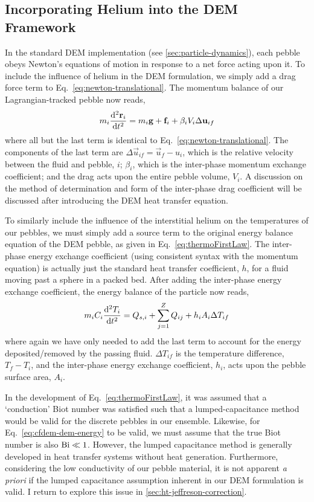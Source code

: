 \subsection{Incorporating Helium into the DEM Framework}\label{sec:cfdem-heat-transfer}

In the standard DEM implementation (see \cref{sec:particle-dynamics}), each pebble obeys Newton's equations of motion in response to a net force acting upon it. To include the influence of helium in the DEM formulation, we simply add a drag force term to Eq.~\ref{eq:newton-translational}. The momentum balance of our Lagrangian-tracked pebble now reads,
\begin{equation}\label{eq:cfdem-dem-momentum}
	m_i  \frac{\mathrm{d}^2{\mathbf{r}_i}}{\mathrm{d}t^2} = m_i\mathbf{g} + \mathbf{f}_i + \beta_i V_i \Delta \mathbf{u}_{if}
\end{equation}
where all but the last term is identical to Eq.~\ref{eq:newton-translational}. The components of the last term are $\Delta \vec{u}_{if} = \vec{u}_f - u_i$, which is the relative velocity between the fluid and pebble, $i$; $\beta_i$, which is the inter-phase momentum exchange coefficient; and the drag acts upon the entire pebble volume, $V_i$. A discussion on the method of determination and form of the inter-phase drag coefficient will be discussed after introducing the DEM heat transfer equation.

To similarly include the influence of the interstitial helium on the temperatures of our pebbles, we must simply add a source term to the original energy balance equation of the DEM pebble, as given in Eq.~\ref{eq:thermoFirstLaw}. The inter-phase energy exchange coefficient (using consistent syntax with the momentum equation) is actually just the standard heat transfer coefficient, $h$, for a fluid moving past a sphere in a packed bed. After adding the inter-phase energy exchange coefficient, the energy balance of the particle now reads,
\begin{equation}\label{eq:cfdem-dem-energy}
	m_iC_i \frac{\mathrm{d}^2{T_i}}{\mathrm{d}t^2} = Q_{s,i} + \sum_{j=1}^Z Q_{ij} + h_i A_i \Delta T_{if}
\end{equation}
where again we have only needed to add the last term to account for the energy deposited/removed by the passing fluid. $\Delta T_{if}$ is the temperature difference, $T_f - T_i$, and the inter-phase energy exchange coefficient, $h_i$, acts upon the pebble surface area, $A_i$.

In the development of Eq.~\ref{eq:thermoFirstLaw}, it was assumed that a `conduction' Biot number was satisfied such that a lumped-capacitance method would be valid for the discrete pebbles in our ensemble. Likewise, for Eq.~\ref{eq:cfdem-dem-energy} to be valid, we must assume that the true Biot number is also $\mathrm{Bi} \ll 1$. However, the lumped capacitance method is generally developed in heat transfer systems without heat generation. Furthermore, considering the low conductivity of our pebble material, it is not apparent \textit{a priori} if the lumped capacitance assumption inherent in our DEM formulation is valid. I return to explore this issue in \cref{sec:ht-jeffreson-correction}.


